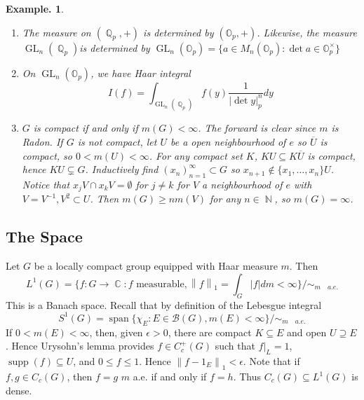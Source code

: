 \documentclass[11pt, a4paper]{memoir}
\DeclareMathOperator{\N}{{\mathbb{N}}}
\DeclareMathOperator{\Q}{{\mathbb{Q}}}
\DeclareMathOperator{\R}{{\mathbb{R}}}
\DeclareMathOperator{\C}{{\mathbb{C}}}
\newcommand{\norm}[1]{\ensuremath{\left\lVert#1\right\rVert}}
\theoremstyle{change}
\theoremstyle{plain}
\theoremstyle{nonumberplain}
\newtheorem{example}{Example.}
\DeclareMathOperator{\GL}{GL}
\DeclareMathOperator{\spn}{span}
\DeclareMathOperator{\supp}{supp}
\numberwithin{equation}{section}
\begin{document}
\begin{example}
\begin{enumerate}[nl,r]
\begin{enumerate}[nl,a]
                    Thus, a closed non-open subgroup $H$ of $G$ is always $m$-locally null.
                    Hence, if $G$ is $\sigma$-compact, then closed non-open $H$ are $m$-null.
                    However, if $G=\R\times\R_d$, $H=\{0\}\times\R_d$ is closed, $m$-locally null, but not $m$-null.
            \end{enumerate}
        \item The measure on $(\Q_p,+)$ is determined by $(\mathbb{O}_p,+)$.
            Likewise, the measure $\GL_n(\Q_p)$is determined by $\GL_n(\mathbb{O}_p)=\{a\in M_n(\mathbb{O}_p):\det a\in\mathbb{O}_p^\times\}$
        \item On $\GL_n(\mathbb{O}_p)$, we have Haar integral
            \begin{equation*}
                I(f)=\int_{\GL_n(\Q_p)}f(y)\frac{1}{|\det y|_p^n}dy
            \end{equation*}
        \item $G$ is compact if and only if $m(G)<\infty$.
            The forward is clear since $m$ is Radon.
            If $G$ is not compact, let $U$ be a open neighbourhood of $e$ so $\overline{U}$ is compact, so $0<m(U)<\infty$.
            For any compact set $K$, $KU\subseteq K\overline{U}$ is compact, hence $KU\subsetneq G$.
            Inductively find $(x_n)_{n=1}^\infty\subset G$ so $x_{n+1}\notin\{x_1,\ldots,x_n\}U$.
            Notice that $x_jV\cap x_kV=\emptyset$ for $j\neq k$ for $V$ a neighbourhood of $e$ with $V=V^{-1},V^2\subset U$.
            Then $m(G)\geq nm(V)$ for any $n\in\N$, so $m(G)=\infty$.
    \end{enumerate}
\end{example}
\subsection{The Space }
Let $G$ be a locally compact group equipped with Haar measure $m$.
Then
\begin{equation*}
    L^1(G)=\{f:G\to\C:f\text{ measurable},\norm{f}_1=\int_G|f|dm<\infty\}/\sim_{m\quad a.e.}
\end{equation*}
This is a Banach space.
Recall that by definition of the Lebesgue integral
\begin{equation*}
    S^1(G)=\spn\{\chi_E:E\in\mathcal{B}(G),m(E)<\infty\}/\sim_{m\quad a.e.}
\end{equation*}
If $0<m(E)<\infty$, then, given $\epsilon>0$, there are compact $K\subseteq E$ and open $U\supseteq E$.
Hence Urysohn's lemma provides $f\in C_c^+(G)$ such that $f|_L=1$, $\supp(f)\subseteq U$, and $0\leq f\leq 1$.
Hence $\norm{f-1_E}_1<\epsilon$.
Note that if $f,g\in C_c(G)$, then $f=g$ $m$ a.e. if and only if $f=h$.
Thus $C_c(G)\subseteq L^1(G)$ is dense.
\end{document}
